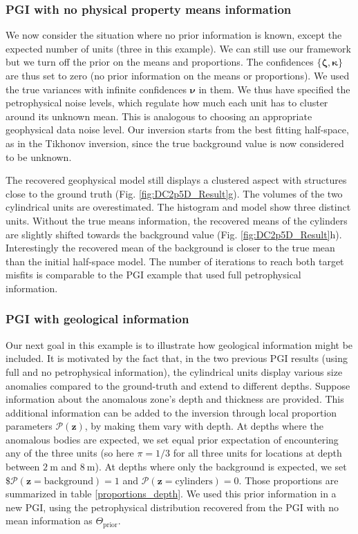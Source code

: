 \documentclass[extra]{gji} %
\begin{document}
\subsubsection{PGI with no physical property means information}

We now consider the situation where no prior information is known, except the expected number of units (three in this example). We can still use our framework but we turn off the prior on the means and proportions. The confidences $\{\mathbf{\zeta},\mathbf{\kappa}\}$ are thus set to zero (no prior information on the means or proportions). We used the true variances with infinite confidences $\mathbf{\nu}$ in them. We thus have specified the petrophysical noise levels, which regulate how much each unit has to cluster around its unknown mean. This is analogous to choosing an appropriate geophysical data noise level. Our inversion starts from the best fitting half-space, as in the Tikhonov inversion, since the true background value is now considered to be unknown.

The recovered geophysical model still displays a clustered aspect with structures close to the ground truth (Fig. \ref{fig:DC2p5D_Result}g). The volumes of the two cylindrical units are overestimated. The histogram and model show three distinct units. Without the true means information, the recovered means of the cylinders are slightly shifted towards the background value (Fig. \ref{fig:DC2p5D_Result}h). Interestingly the recovered mean of the background is closer to the true mean than the initial half-space model. The number of iterations to reach both target misfits is comparable to the PGI example that used full petrophysical information.


\subsubsection{PGI with geological information}

Our next goal in this example is to illustrate how geological information might be included. It is motivated by the fact that, in the two previous PGI results (using full and no petrophysical information), the cylindrical units display various size anomalies compared to the ground-truth and extend to different depths. Suppose information about the anomalous zone's depth and thickness are provided. This additional information can be added to the inversion through local proportion parameters $\mathcal{P}(\mathbf{z})$, by making them vary with depth. At depths where the anomalous bodies are expected, we set equal prior expectation of encountering any of the three units (so here $\pi=1/3$ for all three units for locations at depth between $2~\text{m}$ and $8~\text{m}$). At depths where only the background is expected, we set $\$\mathcal{P}(\mathbf{z}=\text{background})=1$ and $\mathcal{P}(\mathbf{z}=\text{cylinders})=0$. Those proportions are summarized in table \ref{proportions_depth}. We used this prior information in a new PGI, using the petrophysical distribution recovered from the PGI with no mean information as $\Theta_{\text{prior}}$.
\end{document}

